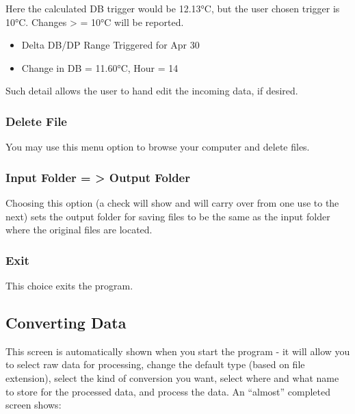 Here the calculated DB trigger would be 12.13°C, but the user chosen trigger is 10°C. Changes \textgreater{} = 10°C will be reported.

\begin{itemize}
\item
  Delta DB/DP Range Triggered for Apr 30
\item
  Change in DB = 11.60°C, Hour = 14
\end{itemize}

Such detail allows the user to hand edit the incoming data, if desired.

\subsubsection{Delete File}\label{delete-file}

You may use this menu option to browse your computer and delete files.

\subsubsection{Input Folder = \textgreater{} Output Folder}\label{input-folder-output-folder}

Choosing this option (a check will show and will carry over from one use to the next) sets the output folder for saving files to be the same as the input folder where the original files are located.

\subsubsection{Exit}\label{exit}

This choice exits the program.

\subsection{Converting Data}\label{converting-data}

This screen is automatically shown when you start the program - it will allow you to select raw data for processing, change the default type (based on file extension), select the kind of conversion you want, select where and what name to store for the processed data, and process the data. An ``almost'' completed screen shows:

